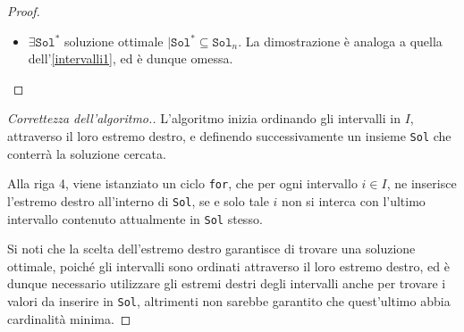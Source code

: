 \documentclass[a4paper, 12pt]{report}
\begin{document}
\begin{proof}
\begin{itemize}
\begin{itemize}
                    \item sia $j \in [1, n) \mid x \in [a_j, b_j]$; allora, si verifica uno dei seguenti casi:
                        \begin{itemize}
                            \item $j \le k \implies \exists \hat x \in \texttt{Sol}_k \mid \hat x \in [a_j, b_j]$ poiché doveva essere già stato analizzato dall'algoritmo
                            \item $j > k + 1 \implies b_j > b_{k +1}$; si noti inoltre che l'intervallo $[a_j, b_j]$ è stato scelto tale che $x \in [a_j, b_j]$, e poiché $x \in [a_{k +1}, b_{k +1}]$ per sua definizione, si verifica necessariamente che $$\left .\begin{array}{r} x \in [a_j , b_j] \cap [a_{k + 1}, b_{k +1}] \neq \varnothing \\ b_j > b_{k +1} \end{array} \right \} \implies a_j \le x \le b_{k +1} \le b_j$$ in particolare, si noti che $b_{k +1} \in [a_j, b_j]$, e poiché la dimostrazione non dipende dalla scelta di $x \in \texttt{Sol}^* - \texttt{Sol}_k$, né da $j \in [1, n)$, si ha che $b_{k +1}$ copre ogni intervallo coperto da $x$; allora, per far si che esista soluzione ottimale $\texttt{Sol}^*$ tale da contenere $\texttt{Sol}_{k +1} = \texttt{Sol}_k \cup \{b_{k +1}\}$, è sufficiente considerare $$(\texttt{Sol}^* - \{x\}) \cup \{b_{k +1}\}$$
                        \end{itemize}
                \end{itemize}
            \item[]  $\exists \texttt{Sol}^*$ soluzione ottimale $\mid \texttt{Sol}^* \subseteq \texttt{Sol}_n$. La dimostrazione è analoga a quella dell'\cref{intervalli1}, ed è dunque omessa.
        \end{itemize}
    \end{proof}

    \begin{proof}[Correttezza dell'algoritmo.]
        L'algoritmo inizia ordinando gli intervalli in $I$, attraverso il loro estremo destro, e definendo successivamente un insieme \texttt{Sol} che conterrà la soluzione cercata.

        Alla riga 4, viene istanziato un ciclo \texttt{for}, che per ogni intervallo $i \in I$, ne inserisce l'estremo destro all'interno di \texttt{Sol}, se e solo tale $i$ non si interca con l'ultimo intervallo contenuto attualmente in \texttt{Sol} stesso.

        Si noti che la scelta dell'estremo destro garantisce di trovare una soluzione ottimale, poiché gli intervalli sono ordinati attraverso il loro estremo destro, ed è dunque necessario utilizzare gli estremi destri degli intervalli anche per trovare i valori da inserire in \texttt{Sol}, altrimenti non sarebbe garantito che quest'ultimo abbia cardinalità minima.
    \end{proof}
\end{document}
